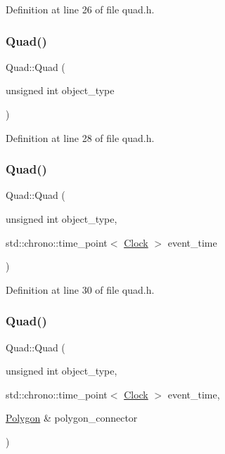 Definition at line 26 of file quad.\+h.

\mbox{\label{class_quad_a8a0b4e52a52ac35a4a78fac3a0cd36b8}} 
\subsubsection{\texorpdfstring{Quad()}{Quad()}\hspace{0.1cm}{\footnotesize\ttfamily [2/4]}}
{\footnotesize\ttfamily Quad\+::\+Quad (\begin{DoxyParamCaption}\item[{unsigned int}]{object\+\_\+type }\end{DoxyParamCaption})\hspace{0.3cm}{\ttfamily [inline]}}



Definition at line 28 of file quad.\+h.

\mbox{\label{class_quad_aa22093808d9a84db2bf826ccacee415e}} 
\subsubsection{\texorpdfstring{Quad()}{Quad()}\hspace{0.1cm}{\footnotesize\ttfamily [3/4]}}
{\footnotesize\ttfamily Quad\+::\+Quad (\begin{DoxyParamCaption}\item[{unsigned int}]{object\+\_\+type,  }\item[{std\+::chrono\+::time\+\_\+point$<$ \mbox{\hyperlink{universe_8h_a0ef8d951d1ca5ab3cfaf7ab4c7a6fd80}{Clock}} $>$}]{event\+\_\+time }\end{DoxyParamCaption})\hspace{0.3cm}{\ttfamily [inline]}}



Definition at line 30 of file quad.\+h.

\mbox{\label{class_quad_a4bb08fd4d953ce61076ed06b51ee2793}} 
\subsubsection{\texorpdfstring{Quad()}{Quad()}\hspace{0.1cm}{\footnotesize\ttfamily [4/4]}}
{\footnotesize\ttfamily Quad\+::\+Quad (\begin{DoxyParamCaption}\item[{unsigned int}]{object\+\_\+type,  }\item[{std\+::chrono\+::time\+\_\+point$<$ \mbox{\hyperlink{universe_8h_a0ef8d951d1ca5ab3cfaf7ab4c7a6fd80}{Clock}} $>$}]{event\+\_\+time,  }\item[{\mbox{\hyperlink{class_polygon}{Polygon}} \&}]{polygon\+\_\+connector }\end{DoxyParamCaption})\hspace{0.3cm}{\ttfamily [inline]}}



